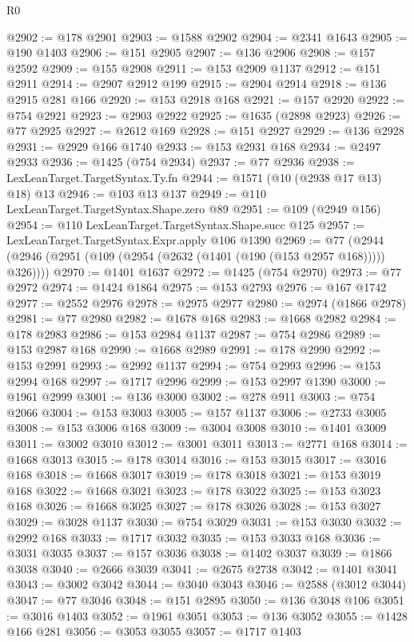 \begin{lexlean}{R0}
\begin{coremodule}
@2902 := @178 @2901
@2903 := @1588 @2902
@2904 := @2341 @1643
@2905 := @190 @1403
@2906 := @151 @2905
@2907 := @136 @2906
@2908 := @157 @2592
@2909 := @155 @2908
@2911 := @153 @2909 @1137
@2912 := @151 @2911
@2914 := @2907 @2912 @199
@2915 := @2904 @2914
@2918 := @136 @2915 @281 @166
@2920 := @153 @2918 @168
@2921 := @157 @2920
@2922 := @754 @2921
@2923 := @2903 @2922
@2925 := @1635 (@2898 @2923)
@2926 := @77 @2925
@2927 := @2612 @169
@2928 := @151 @2927
@2929 := @136 @2928
@2931 := @2929 @166 @1740
@2933 := @153 @2931 @168
@2934 := @2497 @2933
@2936 := @1425 (@754 @2934)
@2937 := @77 @2936
@2938 := LexLeanTarget.TargetSyntax.Ty.fn
@2944 := @1571 (@10 (@2938 @17 @13) @18) @13
@2946 := @103 @13 @137
@2949 := @110 LexLeanTarget.TargetSyntax.Shape.zero @89
@2951 := @109 (@2949 @156)
@2954 := @110 LexLeanTarget.TargetSyntax.Shape.succ @125
@2957 := LexLeanTarget.TargetSyntax.Expr.apply @106 @1390
@2969 := @77 (@2944 (@2946 (@2951 (@109 (@2954 (@2632 (@1401 (@190 (@153 @2957 @168))))) @326))))
@2970 := @1401 @1637
@2972 := @1425 (@754 @2970)
@2973 := @77 @2972
@2974 := @1424 @1864
@2975 := @153 @2793
@2976 := @167 @1742
@2977 := @2552 @2976
@2978 := @2975 @2977
@2980 := @2974 (@1866 @2978)
@2981 := @77 @2980
@2982 := @1678 @168
@2983 := @1668 @2982
@2984 := @178 @2983
@2986 := @153 @2984 @1137
@2987 := @754 @2986
@2989 := @153 @2987 @168
@2990 := @1668 @2989
@2991 := @178 @2990
@2992 := @153 @2991
@2993 := @2992 @1137
@2994 := @754 @2993
@2996 := @153 @2994 @168
@2997 := @1717 @2996
@2999 := @153 @2997 @1390
@3000 := @1961 @2999
@3001 := @136 @3000
@3002 := @278 @911
@3003 := @754 @2066
@3004 := @153 @3003
@3005 := @157 @1137
@3006 := @2733 @3005
@3008 := @153 @3006 @168
@3009 := @3004 @3008
@3010 := @1401 @3009
@3011 := @3002 @3010
@3012 := @3001 @3011
@3013 := @2771 @168
@3014 := @1668 @3013
@3015 := @178 @3014
@3016 := @153 @3015
@3017 := @3016 @168
@3018 := @1668 @3017
@3019 := @178 @3018
@3021 := @153 @3019 @168
@3022 := @1668 @3021
@3023 := @178 @3022
@3025 := @153 @3023 @168
@3026 := @1668 @3025
@3027 := @178 @3026
@3028 := @153 @3027
@3029 := @3028 @1137
@3030 := @754 @3029
@3031 := @153 @3030
@3032 := @2992 @168
@3033 := @1717 @3032
@3035 := @153 @3033 @168
@3036 := @3031 @3035
@3037 := @157 @3036
@3038 := @1402 @3037
@3039 := @1866 @3038
@3040 := @2666 @3039
@3041 := @2675 @2738
@3042 := @1401 @3041
@3043 := @3002 @3042
@3044 := @3040 @3043
@3046 := @2588 (@3012 @3044)
@3047 := @77 @3046
@3048 := @151 @2895
@3050 := @136 @3048 @106
@3051 := @3016 @1403
@3052 := @1961 @3051
@3053 := @136 @3052
@3055 := @1428 @166 @281
@3056 := @3053 @3055
@3057 := @1717 @1403

\end{coremodule}
\end{lexlean}
